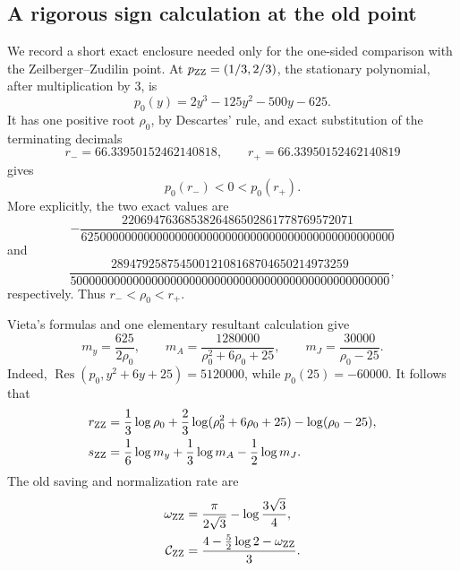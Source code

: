 \documentclass[11pt,reqno,letterpaper]{amsart}
\numberwithin{equation}{section}
\theoremstyle{definition}
\theoremstyle{remark}
\begin{document}
\subsection{A rigorous sign calculation at the old point}
\label{subsec:old-point-sign}

We record a short exact enclosure needed only for the one-sided
comparison with the Zeilberger--Zudilin point.  At
\(p_{\rm ZZ}=(1/3,2/3)\), the stationary polynomial, after multiplication
by \(3\), is
\[
 p_0(y)=2y^3-125y^2-500y-625.
\]
It has one positive root \(\rho_0\), by Descartes' rule, and exact
substitution of the terminating decimals
\[
 r_- =66.33950152462140818,\qquad
 r_+ =66.33950152462140819
\]
gives
\[
 p_0(r_-)<0<p_0(r_+).
\]
More explicitly, the two exact values are
\[
 -\frac{2206947636853826486502861778769572071}
 {62500000000000000000000000000000000000000000000000}
\]
and
\[
 \frac{28947925875450012108168704650214973259}
 {500000000000000000000000000000000000000000000000000},
\]
respectively.  Thus \(r_-<\rho_0<r_+\).

Vieta's formulas and one elementary resultant calculation give
\begin{equation}\label{eq:old-point-moduli}
 m_y=\frac{625}{2\rho_0},\qquad
 m_A=\frac{1280000}{\rho_0^2+6\rho_0+25},\qquad
 m_J=\frac{30000}{\rho_0-25}.
\end{equation}
Indeed,
\(\operatorname{Res}(p_0,y^2+6y+25)=5120000\), while
\(p_0(25)=-60000\).  It follows that
\begin{align}
 r_{\rm ZZ}
 &=\frac13\log\rho_0+
   \frac23\log(\rho_0^2+6\rho_0+25)-\log(\rho_0-25),
 \label{eq:old-r-formula}\\
 s_{\rm ZZ}
 &=\frac16\log m_y+\frac13\log m_A-\frac12\log m_J.
 \label{eq:old-s-formula}
\end{align}
The old saving and normalization rate are
\begin{align}
 \omega_{\rm ZZ}
 &=\frac{\pi}{2\sqrt3}-\log\frac{3\sqrt3}{4},
 \label{eq:old-omega-formula}\\
 \mathcal C_{\rm ZZ}
 &=\frac{4-\frac52\log2-\omega_{\rm ZZ}}3.
 \label{eq:old-C-formula}
\end{align}
\end{document}
